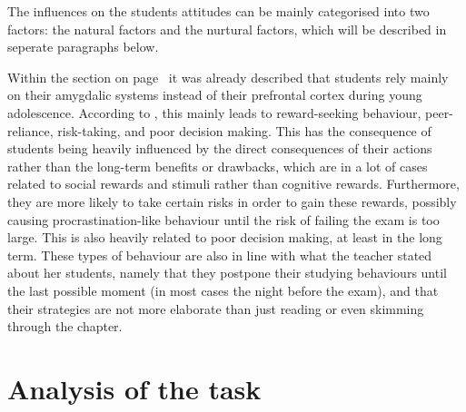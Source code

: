 The influences on the students attitudes can be mainly categorised into two factors: the natural factors and the nurtural factors, which will be described in seperate paragraphs below.

Within the section  on page~\pageref{subsec:physiologicalchar} it was already described that students rely mainly on their amygdalic systems instead of their prefrontal cortex during young adolescence. According to , this mainly leads to reward-seeking behaviour, peer-reliance, risk-taking, and poor decision making. This has the consequence of students being heavily influenced by the direct consequences of their actions rather than the long-term benefits or drawbacks, which are in a lot of cases related to social rewards and stimuli rather than cognitive rewards. Furthermore, they are more likely to take certain risks in order to gain these rewards, possibly causing procrastination-like behaviour until the risk of failing the exam is too large. This is also heavily related to poor decision making, at least in the long term. These types of behaviour are also in line with what the teacher stated about her students, namely that they postpone their studying behaviours until the last possible moment (in most cases the night before the exam), and that their strategies are not more elaborate than just reading or even skimming through the chapter.







\section{Analysis of the task}

